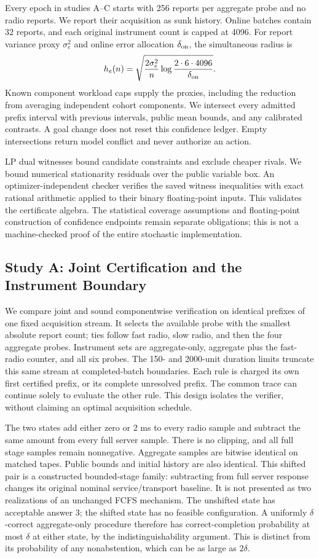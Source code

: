 Every epoch in studies A--C starts with 256 reports per aggregate probe and
no radio reports. We report their acquisition as sunk history. Online batches
contain 32 reports, and each original instrument count is capped at 4096.
For report variance proxy $\sigma_e^2$ and online error allocation
$\delta_{\rm on}$, the simultaneous radius is
$$
h_e(n)=\sqrt{\frac{2\sigma_e^2}{n}
                    \log\frac{2\cdot6\cdot4096}{\delta_{\rm on}}}.
$$
Known component workload caps supply the proxies, including the reduction
from averaging independent cohort components. We intersect every admitted
prefix interval with previous intervals, public mean bounds, and any
calibrated contrasts. A goal change does not reset this confidence ledger.
Empty intersections return model conflict and never authorize an action.

LP dual witnesses bound candidate constraints and exclude cheaper rivals.
We bound numerical stationarity residuals over the public variable box.
An optimizer-independent checker verifies the saved witness inequalities
with exact rational arithmetic applied to their binary floating-point inputs.
This validates the certificate algebra. The statistical coverage assumptions
and floating-point construction of confidence endpoints remain separate
obligations; this is not a machine-checked proof of the entire stochastic
implementation.

\subsection{Study A: Joint Certification and the Instrument Boundary}

We compare joint and sound componentwise verification on identical prefixes
of one fixed acquisition stream. It selects the available probe with the
smallest absolute report count; ties follow fast radio, slow radio, and then
the four aggregate probes. Instrument sets are aggregate-only, aggregate plus
the fast-radio counter, and all six probes. The 150- and 2000-unit duration
limits truncate this same stream at completed-batch boundaries. Each rule is
charged its own first certified prefix, or its complete unresolved prefix.
The common trace can continue solely to evaluate the other rule. This design
isolates the verifier, without claiming an optimal acquisition schedule.

The two states add either zero or 2 ms to every radio sample and subtract
the same amount from every full server sample. There is no clipping, and all
full stage samples remain nonnegative. Aggregate samples are bitwise identical
on matched tapes. Public bounds and initial history are also identical.
This shifted pair is a constructed bounded-stage family: subtracting from
full server response changes its original nominal service/transport baseline.
It is not presented as two realizations of an unchanged FCFS mechanism.
The unshifted state has acceptable answer $3$; the shifted state has no
feasible configuration. A uniformly $\delta$-correct aggregate-only procedure
therefore has correct-completion probability at most $\delta$ at either
state, by the indistinguishability argument. This is distinct from its
probability of any nonabstention, which can be as large as $2\delta$.

